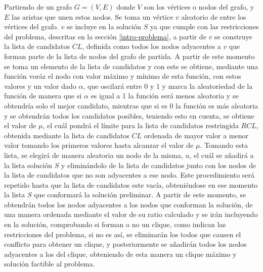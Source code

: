 Partiendo de un grafo $G=(V, E)$ donde $V$ son los vértices o nodos del grafo, y $E$ las aristas que unen estos nodos. Se toma un vértice $v$ aleatorio de entre los vértices del grafo. $v$ se incluye en la solución $S$ ya que cumple con las restricciones del problema, descritas en la sección \ref{intro-problema}, a partir de $v$ se construye la lista de candidatos $CL$, definida como todos los nodos adyacentes a $v$ que forman parte de la lista de nodos del grafo de partida. A partir de este momento se toma un elemento de la lista de candidatos y con este se obtiene, mediante una función voráz el nodo con valor máximo y mínimo de esta función, con estos valores y un valor dado $\alpha$, que oscilará entre $0$ y $1$ y marca la aleatoriedad de la función de manera que si $\alpha$ es igual a 1 la función será menos aleatoria y se obtendría solo el mejor candidato, mientras que si es 0 la función es más aleatoria y se obtendrán todos los candidatos posibles, teniendo esto en cuenta, se obtiene el valor de $\mu$, el cuál pondrá el límite para la lista de candidatos restringida $RCL$, obtenida mediante la lista de candidatos $CL$ ordenada de mayor valor a menor valor tomando los primeros valores hasta alcanzar el valor de $\mu$. Tomando esta lista, se elegirá de manera aleatoria un nodo de la misma, $u$, el cuál se añadirá a la lista solución $S$ y eliminándolo de la lista de candidatos junto con los nodos de la lista de candidatos que no son adyacentes a ese nodo. Este procedimiento será repetido hasta que la lista de candidatos este vacía, obteniéndose en ese momento la lista $S$ que conformará la solución preliminar.
A partir de este momento, se obtendrán todos los nodos adyacentes a los nodos que conforman la solución, de una manera ordenada mediante el valor de su ratio calculado y se irán incluyendo en la solución, comprobando si forman o no un clique, como indican las restricciones del problema, si no es así, se eliminarán los todos que causen el conflicto para obtener un clique, y posteriormente se añadirán todos los nodos adyacentes a los del clique, obteniendo de esta manera un clique máximo y solución factible al problema.

